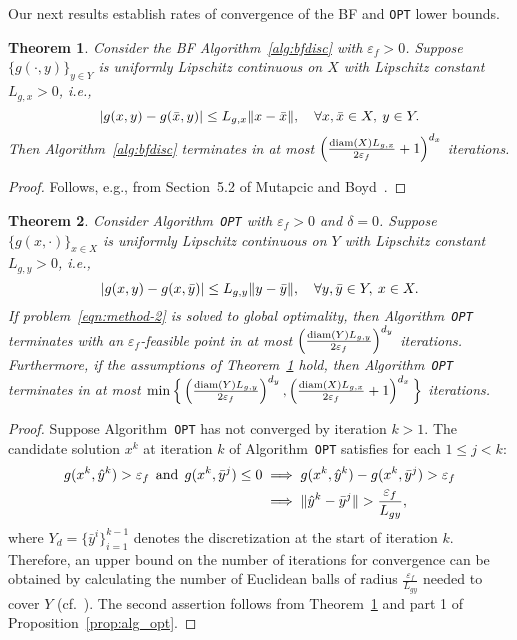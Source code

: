 \documentclass{article}
\DeclarePairedDelimiter\abs{\lvert}{\rvert}%
\DeclarePairedDelimiter\norm{\lVert}{\rVert}%
\newcommand{\1}[1]{\mathds{1}\left[#1\right]}
\newtheorem{theorem}{Theorem}[]
\begin{document}
Our next results establish rates of convergence of the BF and \texttt{OPT} lower bounds.


\begin{theorem}
\label{thm:convrate_bf}
Consider the BF Algorithm~\ref{alg:bfdisc} with $\varepsilon_f > 0$.
Suppose $\{g(\cdot,y)\}_{y \in Y}$ is uniformly Lipschitz continuous on $X$ with Lipschitz constant $L_{g,x} > 0$, i.e.,
\[
\abs{g(x,y) - g(\bar{x},y)} \leq L_{g,x} \norm{x - \bar{x}}, \quad \forall x, \bar{x} \in X, \: y \in Y.
\]
Then Algorithm~\ref{alg:bfdisc} terminates in at most $\left(\frac{\textup{diam}(X) L_{g,x}}{2\varepsilon_f} + 1\right)^{d_x}$ iterations.
\end{theorem}
\begin{proof}
Follows, e.g., from Section~5.2 of Mutapcic and Boyd~\cite{mutapcic2009cutting}.
\end{proof}


\begin{theorem}
\label{thm:convrate_opt}
Consider Algorithm~\texttt{OPT} with $\varepsilon_f > 0$ and $\delta = 0$.
Suppose $\{g(x,\cdot)\}_{x \in X}$ is uniformly Lipschitz continuous on $Y$ with Lipschitz constant $L_{g,y} > 0$, i.e.,
\[
\abs{g(x,y) - g(x,\bar{y})} \leq L_{g,y} \norm{y - \bar{y}}, \quad \forall y, \bar{y} \in Y, \: x \in X.
\]
If problem~\eqref{eqn:method-2} is solved to \textit{global} optimality, then Algorithm~\texttt{OPT} terminates with an $\varepsilon_f$-feasible point in at most $\left(\frac{\textup{diam}(Y) L_{g,y}}{2\varepsilon_f}\right)^{d_y}$ iterations.
Furthermore, if the assumptions of Theorem~\ref{thm:convrate_bf} hold, then Algorithm~\texttt{OPT} terminates in at most $\min\Big\{\left(\frac{\textup{diam}(Y) L_{g,y}}{2\varepsilon_f}\right)^{d_y}, \left(\frac{\textup{diam}(X) L_{g,x}}{2\varepsilon_f} + 1\right)^{d_x}\Big\}$ iterations.
\end{theorem}
\begin{proof}
Suppose Algorithm~\texttt{OPT} has not converged by iteration $k > 1$.
The candidate solution $x^k$ at iteration $k$ of Algorithm~\texttt{OPT} satisfies for each $1 \leq j < k$:
\begin{align*}
g(x^k,\hat{y}^k) > \varepsilon_f \:\: \text{and} \:\: g(x^k,\bar{y}^j) \leq 0 &\implies g(x^k, \hat{y}^k) - g(x^k, \bar{y}^j) > \varepsilon_f \\*
&\implies \norm{\hat{y}^k - \bar{y}^j} > \frac{\varepsilon_f}{L_{gy}},
\end{align*}
where $Y_d = \{\bar{y}^i\}_{i=1}^{k-1}$ denotes the discretization at the start of iteration $k$.
Therefore, an upper bound on the number of iterations for convergence can be obtained by calculating the number of Euclidean balls of radius $\frac{\varepsilon_f}{L_{gy}}$ needed to cover $Y$ (cf.\ \citep{mutapcic2009cutting}).
The second assertion follows from Theorem~\ref{thm:convrate_bf} and part 1 of Proposition~\ref{prop:alg_opt}.
\end{proof}
\end{document}
